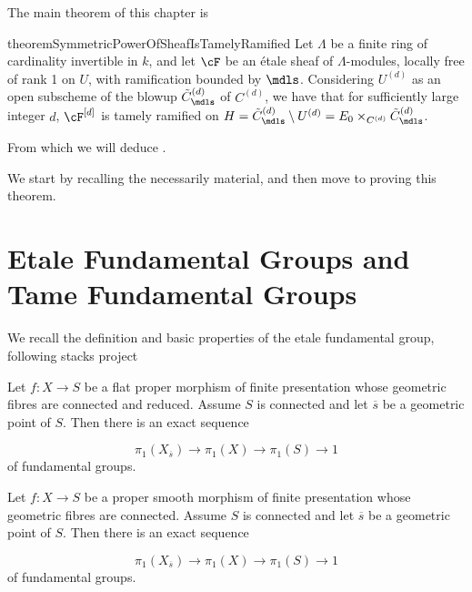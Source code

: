 The main theorem of this chapter is
\begin{restatable}{theorem}{SymmetricPowerOfSheafIsTamelyRamified}\label{theorem:SymmetricPowerOfSheafIsTamelyRamified}
     Let $\Lambda$ be a finite ring of cardinality invertible in $k$, and let $\cF$ be an \'etale sheaf of $\Lambda$-modules, locally free of rank 1 on $U$, with ramification bounded by $\mdls$. 
     Considering $U^{(d)}$ as an open subscheme of the blowup $\tilde{C}^{(d)}_\mdls$ of $C^{(d)}$, we have that
     for sufficiently large integer $d$, $\cF^{[d]}$ is tamely ramified on $H= \tilde{C}^{(d)}_\mdls \setminus U^{(d)}=E_0 \times_{C^{(d)}} \tilde{C}^{(d)}_\mdls $.
\end{restatable}

From which we will deduce .

We start by recalling the necessarily material, and then move to proving this theorem.

\section{Etale Fundamental Groups and Tame Fundamental Groups}
We recall the definition and basic properties of the etale fundamental group, following stacks project 
\begin{prop}[\stackstag{0C0J}]
Let $f : X \to S$ be a flat proper morphism of finite presentation whose geometric fibres are connected and reduced. Assume $S$ is connected and let $\overline{s}$ be a geometric point of $S$. Then there is an exact sequence

\[ \pi _1(X_{\overline{s}}) \to \pi _1(X) \to \pi _1(S) \to 1 \]
of fundamental groups.
    
\end{prop}

\begin{cor}\label{cor:etale_fundamental_group_smooth_proper}
    Let $f : X \to S$ be a proper smooth morphism of finite presentation whose geometric fibres are connected. Assume $S$ is connected and let $\overline{s}$ be a geometric point of $S$. Then there is an exact sequence

    \[ \pi _1(X_{\overline{s}}) \to \pi _1(X) \to \pi _1(S) \to 1 \]
    of fundamental groups.
\end{cor}


